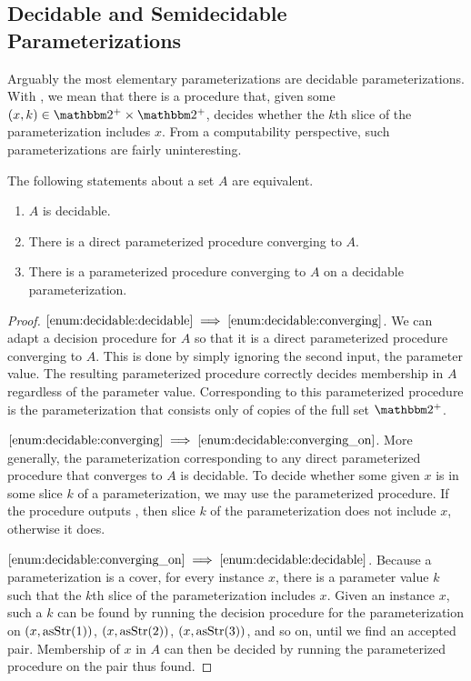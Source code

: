 \subsection{Decidable and Semidecidable Parameterizations}
Arguably the most elementary parameterizations are decidable parameterizations.
With , we mean that there is a procedure that, given some $(x, k) \in \binary^+ \times \binary^+$, decides whether the $k$th slice of the parameterization includes $x$.
From a computability perspective, such parameterizations are fairly uninteresting.
\begin{theorem}
\label{thm:decidable}
  The following statements about a set $A$ are equivalent.
  \begin{enumerate}[series=enum:decidable]
  \item\label{enum:decidable:decidable}
    $A$ is decidable.
  \item\label{enum:decidable:converging}
    There is a direct parameterized procedure converging to $A$.
  \item\label{enum:decidable:converging_on}
    There is a parameterized procedure converging to $A$ on a decidable parameterization.
  \end{enumerate}
\end{theorem}
\begin{proof}
$\ref{enum:decidable:decidable} \implies \ref{enum:decidable:converging}$.
  We can adapt a decision procedure for $A$ so that it is a direct parameterized procedure converging to $A$.
  This is done by simply ignoring the second input, the parameter value.
  The resulting parameterized procedure correctly decides membership in $A$ regardless of the parameter value.
  Corresponding to this parameterized procedure is the parameterization that consists only of copies of the full set $\binary^+$.

$\ref{enum:decidable:converging} \implies \ref{enum:decidable:converging_on}$.
  More generally, the parameterization corresponding to any direct parameterized procedure that converges to $A$ is decidable.
  To decide whether some given $x$ is in some slice $k$ of a parameterization, we may use the parameterized procedure.
  If the procedure outputs , then slice $k$ of the parameterization does not include $x$, otherwise it does.

$\ref{enum:decidable:converging_on} \implies \ref{enum:decidable:decidable}$.
  Because a parameterization is a cover, for every instance $x$, there is a parameter value $k$ such that the $k$th slice of the parameterization includes $x$.
  Given an instance $x$, such a $k$ can be found by running the decision procedure for the parameterization on $(x, \operatorname{asStr}(1))$, $(x, \operatorname{asStr}(2))$, $(x, \operatorname{asStr}(3))$, and so on, until we find an accepted pair.
  Membership of $x$ in $A$ can then be decided by running the parameterized procedure on the pair thus found.
\end{proof}

